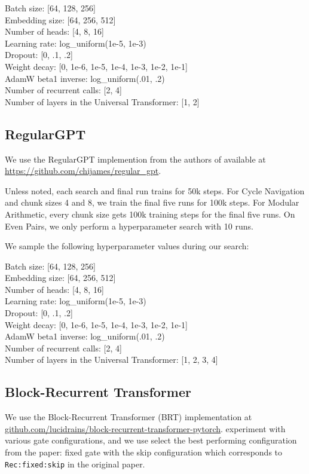 Batch size: [64, 128, 256]\\
Embedding size: [64, 256, 512]\\
Number of heads: [4, 8, 16]\\
Learning rate: log\_uniform(1e-5, 1e-3)\\
Dropout: [0, .1, .2]\\
Weight decay: [0, 1e-6, 1e-5, 1e-4, 1e-3, 1e-2, 1e-1]\\
AdamW beta1 inverse: log\_uniform(.01, .2)\\
Number of recurrent calls: [2, 4]\\
Number of layers in the Universal Transformer: [1, 2]

\subsection{RegularGPT}
We use the RegularGPT implemention from the authors of \citet{chi_transformer_2023} available at \url{https://github.com/chijames/regular_gpt}.

Unless noted, each search and final run trains for 50k steps. For Cycle Navigation and chunk sizes 4 and 8, we train the final five runs for 100k steps. For Modular Arithmetic, every chunk size gets 100k training steps for the final five runs. On Even Pairs, we only perform a hyperparameter search with 10 runs.

We sample the following hyperparameter values during our search:

Batch size: [64, 128, 256]\\
Embedding size: [64, 256, 512]\\
Number of heads: [4, 8, 16]\\
Learning rate: log\_uniform(1e-5, 1e-3)\\
Dropout: [0, .1, .2]\\
Weight decay: [0, 1e-6, 1e-5, 1e-4, 1e-3, 1e-2, 1e-1]\\
AdamW beta1 inverse: log\_uniform(.01, .2)\\
Number of recurrent calls: [2, 4]\\
Number of layers in the Universal Transformer: [1, 2, 3, 4]

\subsection{Block-Recurrent Transformer}
We use the Block-Recurrent Transformer (BRT) implementation at \url{github.com/lucidrains/block-recurrent-transformer-pytorch}. \citet{hutchins_block-recurrent_2022} experiment with various gate configurations, and we use select the best performing configuration from the paper: fixed gate with the skip configuration which corresponds to \texttt{Rec:fixed:skip} in the original paper.

